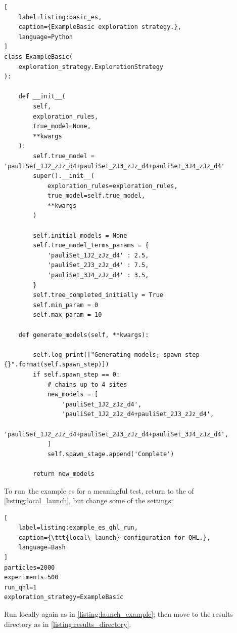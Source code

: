 \begin{lstlisting}[
    label=listing:basic_es,
    caption={ExampleBasic exploration strategy.},
    language=Python
]
class ExampleBasic(
    exploration_strategy.ExplorationStrategy
):

    def __init__(
        self,
        exploration_rules,
        true_model=None,
        **kwargs
    ):
        self.true_model = 'pauliSet_1J2_zJz_d4+pauliSet_2J3_zJz_d4+pauliSet_3J4_zJz_d4'
        super().__init__(
            exploration_rules=exploration_rules,
            true_model=self.true_model,
            **kwargs
        )

        self.initial_models = None
        self.true_model_terms_params = {
            'pauliSet_1J2_zJz_d4' : 2.5,
            'pauliSet_2J3_zJz_d4' : 7.5,
            'pauliSet_3J4_zJz_d4' : 3.5,
        }
        self.tree_completed_initially = True
        self.min_param = 0
        self.max_param = 10

    def generate_models(self, **kwargs):

        self.log_print(["Generating models; spawn step {}".format(self.spawn_step)])
        if self.spawn_step == 0:
            # chains up to 4 sites
            new_models = [
                'pauliSet_1J2_zJz_d4',
                'pauliSet_1J2_zJz_d4+pauliSet_2J3_zJz_d4',
                'pauliSet_1J2_zJz_d4+pauliSet_2J3_zJz_d4+pauliSet_3J4_zJz_d4',
            ]
            self.spawn_stage.append('Complete')

        return new_models

\end{lstlisting}


To run\footnotemark \ the example \gls{es} for a meaningful test, 
    return to the  of \cref{listing:local_launch}, 
    but change some of the settings:
\begin{lstlisting}[
    label=listing:example_es_qhl_run,
    caption={\ttt{local\_launch} configuration for QHL.},
    language=Bash
]
particles=2000
experiments=500
run_qhl=1
exploration_strategy=ExampleBasic
\end{lstlisting}

Run locally again as in \cref{listing:launch_example};
    then move to the \gls{results directory} as in \cref{listing:results_directory}. 
\par 


